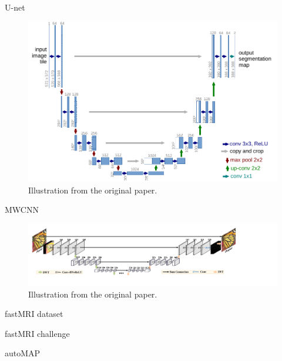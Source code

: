\begin{frame}{U-net}
    \begin{figure}
        \centering
        \includegraphics[height=0.6\textheight]{Figures/add_slides/unet_hires.pdf}
        \caption{Illustration from the original paper.}
    \end{figure}
\end{frame}

\begin{frame}{MWCNN}
    \begin{figure}
        \centering
        \includegraphics[width=\textwidth]{Figures/add_slides/mwcnn.pdf}
        \caption{Illustration from the original paper.}
    \end{figure}
\end{frame}

\begin{frame}{fastMRI dataset}
    
\end{frame}

\begin{frame}{fastMRI challenge}
    
\end{frame}

\begin{frame}{autoMAP}
    
\end{frame}


